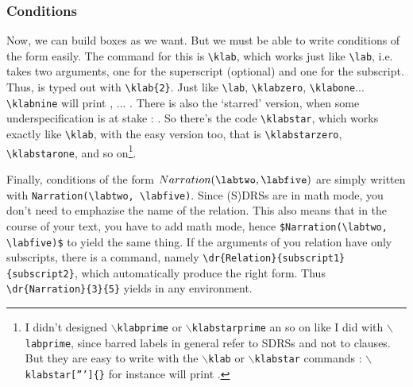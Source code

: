 \documentclass[a4paper]{article}
\begin{document}
\subsubsection{Conditions}
Now, we can build boxes as we want. But we must be able to write conditions of the form \klabtwo easily. The command for this is \verb+\klab+, which works just like \verb+\lab+, i.e. takes two arguments, one for the superscript (optional) and one for the subscript. Thus,  is typed out with \verb+\klab{2}+. Just like \verb+\lab+, \verb+\klabzero+, \verb+\klabone+... \verb+\klabnine+ will print \klabzero, \klabone... \klabnine. There is also the `starred' version, when some underspecification is at stake : . So there's the code \verb+\klabstar+, which works exactly like \verb+\klab+, with the easy version too, that is \verb+\klabstarzero+, \verb+\klabstarone+, and so on\footnote{I didn't designed \texttt{$\backslash$klabprime} or \texttt{$\backslash$klabstarprime} an so on like I did with \texttt{$\backslash$labprime}, since barred labels in general refer to SDRSs and not to clauses. But they are easy to write with the \texttt{$\backslash$klab} or \texttt{$\backslash$klabstar} commands : \texttt{$\backslash$klabstar[''']\{\}} for instance will print \klabstar[''']{}.}. 

Finally, conditions of the form $Narration(\labtwo, \labfive)$ are simply written with \verb+Narration(\labtwo, \labfive)+. Since (S)DRSs are in math mode, you don't need to emphazise the name of the relation. This also means that in the course of your text, you have to add math mode, hence \verb+$Narration(\labtwo, \labfive)$+ to yield the same thing. If the arguments of you relation have only subscripts, there is a command, namely \verb+\dr{Relation}{subscript1}{subscript2}+, which automatically produce the right form. Thus \verb+\dr{Narration}{3}{5}+ yields  in any environment. 
\end{document}
